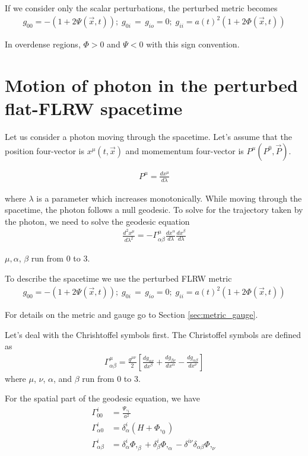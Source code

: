 \documentclass[12pt]{article}
\newcommand{\beqa}{\begin{eqnarray}}
\newcommand{\eeqa}{\end{eqnarray}}
\numberwithin{equation}{section}
\begin{document}
If we consider only the scalar perturbations, the perturbed metric becomes
\beqa
g_{00} = -(1+2\Psi(\vec{x},t)); \; g_{0i} \, = \, g_{io} = 0; \; g_{ii} = a(t)^2 (1+2\Phi(\vec{x},t))
\eeqa

In overdense regions, $\Phi > 0$ and $\Psi < 0$ with this sign convention.


\section{Motion of photon in the perturbed flat-FLRW spacetime}

Let us consider a photon moving through the spacetime. Let's assume that the position four-vector is $x^{\mu} (t,\vec{x})$ and momementum four-vector is $P^{\mu} (P^{0}, \vec{P})$. 

\beqa
P^{\mu} = \frac{dx^\mu}{d\lambda}
\eeqa

where $\lambda$ is a parameter which increases monotonically. While moving through the spacetime, the photon follows a null geodesic. To solve for the trajectory taken by the photon, we need to solve the geodesic equation
\beqa
\frac{d^2x^\mu}{d\lambda ^2} = - \Gamma ^{\mu}_{\alpha \beta} 
\frac{dx^\alpha}{d\lambda}\frac{dx^\beta}{d\lambda} \label{eq:geodesic_photon}
\eeqa 

$\mu, \alpha$, $\beta$ run from 0 to 3.

To describe the spacetime we use the perturbed FLRW metric
\beqa
g_{00} = -(1+2\Psi(\vec{x},t)); \; g_{0i} \, = \, g_{io} = 0; \; g_{ii} = a(t)^2 (1+2\Phi(\vec{x},t))
\eeqa
	
For details on the metric and gauge go to Section \ref{sec:metric_gauge}.
	
Let's deal with the Chrishtoffel symbols first. The Christoffel symbols are defined as
\beqa
\Gamma_{\alpha \beta}^{\mu} = \frac{g^{\mu \nu}}{2} \left[\frac{dg_{\alpha \nu}}{dx^{\beta}} + \frac{dg_{\beta \nu}}{dx^{\alpha}} - \frac{dg_{\alpha \beta}}{dx^{\nu}} \right]
\eeqa
where $\mu$, $\nu$, $\alpha$, and $\beta$ run from $0$ to $3$. 

For the spatial part of the geodesic equation, we have 
\begin{equation}
\begin{aligned}
\Gamma_{00}^{i} &= \frac{\Psi,_{i}}{a^2} \\
\Gamma_{\alpha 0}^{i} &= \delta^{i}_\alpha (H+\Phi,_{0})   \\ 
\Gamma_{\alpha \beta}^{i} &= \delta^{i}_{\alpha} \Phi,_{\beta} + \delta ^{i}_{\beta} \Phi, _{\alpha} - \delta^{i\nu} \delta_{\alpha \beta}\Phi,_{\nu} 
\end{aligned}
\end{equation}
\end{document}
